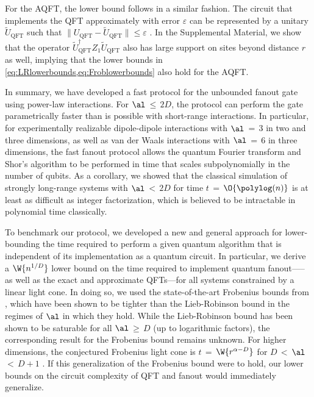 For the AQFT, the lower bound follows in a similar fashion.
The circuit that implements the QFT approximately with error $\varepsilon$ can be represented by a unitary $\tilde{U}_\mathrm{QFT}$ such that $\|U_\mathrm{QFT}-\tilde {U}_\mathrm{QFT}\|\leq \varepsilon$ \cite{Cleve2000}.
In the Supplemental Material, we show that the operator $\tilde {U}_\mathrm{QFT}^\dag Z_1 \tilde {U}_\mathrm{QFT}$ also has large support on sites beyond distance $r$ as well, implying that the lower bounds in \cref{eq:LRlowerbounds,eq:Froblowerbounds} also hold for the AQFT.

In
summary, we have developed a fast protocol for the unbounded fanout gate using power-law interactions.
For $\al$\,$\le$\,$2D$, the protocol can perform the gate parametrically faster than is possible with short-range interactions.
In particular, for experimentally realizable dipole-dipole interactions with $\al$\,$=$\,$3$ in two and three dimensions, as well as van der Waals interactions with $\al$\,$=$\,$6$ in three dimensions, the fast fanout protocol allows the quantum Fourier transform and Shor's algorithm to be performed in time that scales subpolynomially in the number of qubits.
As a corollary, we showed that the classical simulation of strongly long-range systems with $\al$\,$<$\,$2D$ for time $t$\,$=$\,$\O{\polylog(n)}$ is at least as difficult as integer factorization, which is believed to be intractable in polynomial time classically.

To benchmark our protocol, we developed a new and general approach for lower-bounding the time required to perform a given quantum algorithm that is independent of its implementation as a quantum circuit.
In particular, we derive a $\W{n^{1/D}}$ lower bound on the time required to implement quantum fanout—--as well as the exact and approximate QFTs---for all systems constrained by a linear light cone.
In doing so, we used the state-of-the-art Frobenius bounds from \cite{Tran2020,Kuwahara2021,Chen2021}, which have been shown to be tighter than the Lieb-Robinson bound in the regimes of $\al$ in which they hold.
While the Lieb-Robinson bound has been shown to be saturable for all $\al$\,$\ge$\,$D$ (up to logarithmic factors), the corresponding result for the Frobenius bound remains unknown.
For higher dimensions, the conjectured Frobenius light cone is $t$\,$=$\,$\W{r^{\alpha-D}}$ for $D$\,$<$\,$\al$\,$<$\,$D+1$ \cite{Chen2021}.
If this generalization of the Frobenius bound were to hold, our lower bounds on the circuit complexity of QFT and fanout would immediately generalize.

